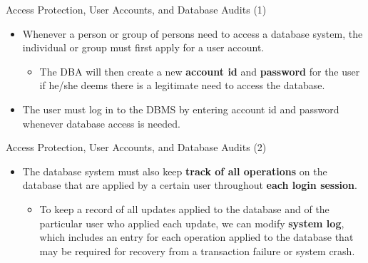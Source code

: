 \begin{frame}{Access Protection, User Accounts, and Database Audits (1)}
    \Large
    
    \begin{itemize}
        \vspace{-1.5cm}
        
        \item Whenever a person or group of persons need to access a database system, the individual or group must first apply for a user account.
        
        \begin{itemize}
            \large
            \setlength{\itemsep}{0.2cm}
            
            \item The DBA will then create a new \textbf{account id} and \textbf{password} for the user if he/she deems there is a legitimate need to access the database.
        \end{itemize}
        
        \vspace{0.4cm}
        
        \item The user must log in to the DBMS by entering account id and password whenever database access is needed.
        
    \end{itemize}
\end{frame}


\begin{frame}{Access Protection, User Accounts, and Database Audits (2)}
    \Large
    
    \begin{itemize}
        \vspace{-1.5cm}
        
        \item The database system must also keep \textbf{track of all operations} on the database that are applied by a certain user throughout \textbf{each login session}.
        
        \vspace{0.4cm}
        
        \begin{itemize}
            \large
            \setlength{\itemsep}{0.2cm}
            
            \item To keep a record of all updates applied to the database and of the particular user who applied each update, we can modify \textbf{system log}, which includes an entry for each operation applied to the database that may be required for recovery from a transaction failure or system crash.
        \end{itemize}
        
    \end{itemize}
\end{frame}


